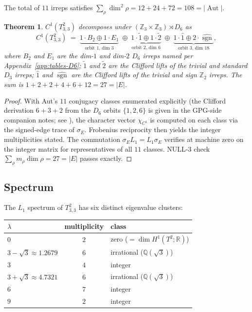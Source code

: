 \documentclass[12pt,a4paper]{article}
\newtheorem{theorem}{Theorem}[section]
\theoremstyle{definition}
\theoremstyle{remark}
\newcommand{\bZ}{\mathbb{Z}}
\newcommand{\bR}{\mathbb{R}}
\newcommand{\bQ}{\mathbb{Q}}                %
\DeclareMathOperator{\Aut}{Aut}
\DeclareMathOperator{\sgn}{sgn}
\begin{document}
The total of $11$ irreps satisfies $\sum_\rho \dim^2 \rho = 12 + 24 + 72 = 108 = |\Aut|$.

\begin{theorem}\label{thm:torus-decomp}
$C^1(T^2_{3,3})$ decomposes under $(\bZ_3 \times \bZ_3) \rtimes D_6$ as
\[
  C^1(T^2_{3,3}) \;=\;
  \underbrace{1 \cdot B_2 \oplus 1 \cdot E_1}_{\text{orbit 1, dim 3}}
  \;\oplus\;
  \underbrace{1 \cdot \widetilde 1 \oplus 1 \cdot \widetilde 2}_{\text{orbit 2, dim 6}}
  \;\oplus\;
  \underbrace{1 \cdot \widehat 1 \oplus 2 \cdot \widehat{\sgn}}_{\text{orbit 3, dim 18}},
\]
where $B_2$ and $E_1$ are the dim-$1$ and dim-$2$ $D_6$ irreps named per
Appendix~\ref{app:tables-D6}; $\widetilde 1$ and $\widetilde 2$ are the
Clifford lifts of the trivial and standard $D_3$ irreps; $\widehat 1$ and
$\widehat{\sgn}$ are the Clifford lifts of the trivial and sign
$\bZ_2$ irreps. The sum is $1 + 2 + 2 + 4 + 6 + 12 = 27 = |E|$.
\end{theorem}

\begin{proof}
With Aut's $11$ conjugacy classes enumerated explicitly (the Clifford
derivation $6 + 3 + 2$ from the $D_6$ orbits $\{1, 2, 6\}$ is given in
the GPG-side companion notes; see \cite{tce-substrate-provenance}),
the character vector $\chi_{C^1}$ is computed on each class via the
signed-edge trace of $\sigma_E$. Frobenius reciprocity then yields the
integer multiplicities stated. The commutation $\sigma_E L_1 = L_1 \sigma_E$
verifies at machine zero on the integer matrix for representatives of
all $11$ classes. NULL-3 check $\sum_\rho m_\rho \dim \rho = 27 = |E|$
passes exactly.
\end{proof}

\subsection{Spectrum}\label{sec:torus-spectrum}

The $L_1$ spectrum of $T^2_{3,3}$ has six distinct eigenvalue clusters:

\smallskip
\begin{center}\small
\begin{tabular}{lcl}
\toprule
$\lambda$ & multiplicity & class \\
\midrule
$0$ & $2$ & zero ($= \dim H^1(T^2; \bR)$) \\
$3 - \sqrt 3 \approx 1.2679$ & $6$ & irrational ($\bQ(\sqrt 3)$) \\
$3$ & $4$ & integer \\
$3 + \sqrt 3 \approx 4.7321$ & $6$ & irrational ($\bQ(\sqrt 3)$) \\
$6$ & $7$ & integer \\
$9$ & $2$ & integer \\
\bottomrule
\end{tabular}
\end{center}
\smallskip
\end{document}
